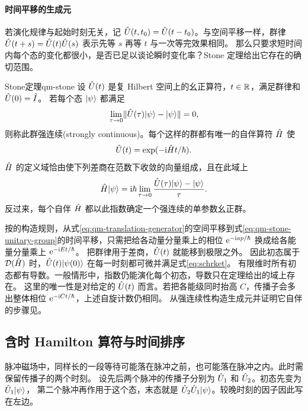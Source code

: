 \paragraph{时间平移的生成元}
若演化规律与起始时刻无关，记 $\hat{U}(t,t_0) = \hat{U}(t - t_0)$。与空间平移一样，群律
$\hat{U}(t + s) = \hat{U}(t)\hat{U}(s)$ 表示先等 $s$ 再等 $t$ 与一次等完效果相同。
那么只要求短时间内每个态的变化都很小，是否已足以谈论瞬时变化率？Stone 定理给出它存在的确切范围\cite{stone}。
\begin{theorem}{Stone定理}{qm-stone}
    设 $\hat{U}(t)$ 是复 Hilbert 空间上的幺正算符，$t \in \mathbb{R}$，满足群律和 $\hat{U}(0) = \hat{I}$。
    若每个态 $\lvert\psi\rangle$ 都满足
    \begin{equation}\label{eq:qm-strong-continuity}
        \lim_{\tau\to 0}\lVert\hat{U}(\tau)\lvert\psi\rangle - \lvert\psi\rangle\rVert = 0,
    \end{equation}
    则称此群强连续(strongly continuous)。每个这样的群都有唯一的自伴算符 $\hat{H}$ 使
    \begin{equation}\label{eq:qm-stone-unitary-group}
        \hat{U}(t) = \exp(-\mathrm{i}\hat{H} t/\hbar).
    \end{equation}
    $\hat{H}$ 的定义域恰由使下列差商在范数下收敛的向量组成，且在此域上
    \begin{equation}\label{eq:qm-stone-generator}
        \hat{H}\lvert\psi\rangle = \mathrm{i}\hbar\lim_{\tau\to0}
        \frac{\hat{U}(\tau)\lvert\psi\rangle - \lvert\psi\rangle}{\tau}.
    \end{equation}
    反过来，每个自伴 $\hat{H}$ 都以此指数确定一个强连续的单参数幺正群。
\end{theorem}
按的构造规则，从式\eqref{eq:qm-translation-generator}的空间平移到式\eqref{eq:qm-stone-unitary-group}的时间平移，只需把给各动量分量乘上的相位 $\mathop{}\!\mathrm{e}^{-\mathrm{i} ap/\hbar}$ 换成给各能量分量乘上 $\mathop{}\!\mathrm{e}^{-\mathrm{i} Et/\hbar}$。
把群律用于差商，$\hat{U}(t)$ 就能移到极限之外。
因此初态属于 $\mathcal D(\hat{H})$ 时，$\hat{U}(t)\lvert\psi(0)\rangle$ 在每一时刻都可微并满足式\eqref{eq:schrket}。
有限维时所有初态都有导数。一般情形中，指数仍能演化每个初态，导数只在定理给出的域上存在。
这里的唯一性是对给定的 $\hat{U}(t)$ 而言。若把各能级同时抬高 $C$，传播子会多出整体相位 $\mathop{}\!\mathrm{e}^{-\mathrm{i} Ct/\hbar}$，上述自旋计数仍相同。
从强连续性构造生成元并证明它自伴的步骤见。

\subsection{含时 Hamilton 算符与时间排序}
脉冲磁场中，同样长的一段等待可能落在脉冲之前，也可能落在脉冲之内。此时需保留传播子的两个时刻。
设先后两个脉冲的传播子分别为 $\hat{U}_1$ 和 $\hat{U}_2$。初态先变为 $\hat{U}_1\lvert\psi\rangle$，
第二个脉冲再作用于这个态，末态就是 $\hat{U}_2\hat{U}_1\lvert\psi\rangle$。较晚时刻的因子因此写在左边。

